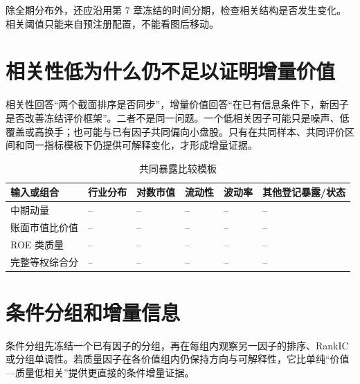 除全期分布外，还应沿用第 7 章冻结的时间分期，检查相关结构是否发生变化。相关阈值只能来自预注册配置，不能看图后移动。

\section{相关性低为什么仍不足以证明增量价值}

相关性回答“两个截面排序是否同步”，增量价值回答“在已有信息条件下，新因子是否改善冻结评价框架”。二者不是同一问题。一个低相关因子可能只是噪声、低覆盖或高换手；也可能与已有因子共同偏向小盘股。只有在共同样本、共同评价区间和同一指标模板下仍提供可解释变化，才形成增量证据。

\begin{table}[htbp]
  \centering
  \footnotesize
  \caption{共同暴露比较模板}
  \label{tab:ch08-exposure-template}
  \begin{tabularx}{\textwidth}{p{3.0cm} p{2.1cm} p{2.1cm} p{2.1cm} p{2.1cm} Y}
    \toprule
    输入或组合 & 行业分布 & 对数市值 & 流动性 & 波动率 & 其他登记暴露/状态 \\
    \midrule
    中期动量 & -- & -- & -- & -- & -- \\
    账面市值比价值 & -- & -- & -- & -- & -- \\
    ROE 类质量 & -- & -- & -- & -- & -- \\
    完整等权综合分 & -- & -- & -- & -- & -- \\
    \bottomrule
  \end{tabularx}
\end{table}

\section{条件分组和增量信息}

条件分组先冻结一个已有因子的分组，再在每组内观察另一因子的排序、RankIC 或分组单调性。若质量因子在各价值组内仍保持方向与可解释性，它比单纯“价值—质量低相关”提供更直接的条件增量证据。

